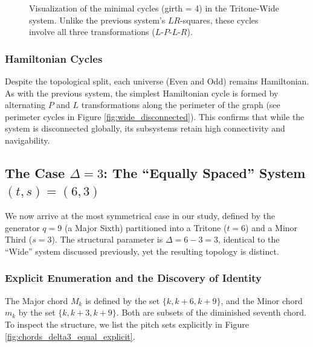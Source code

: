 \documentclass[12pt,letterpaper]{amsart}
\begin{document}
\begin{figure}[H]
    \caption{Visualization of the minimal cycles (girth = 4) in the Tritone-Wide system. Unlike the previous system's $LR$-squares, these cycles involve all three transformations ($L$-$P$-$L$-$R$).}
    \label{fig:wide_minimal}
\end{figure}

\subsubsection{Hamiltonian Cycles}
Despite the topological split, each universe (Even and Odd) remains Hamiltonian. As with the previous system, the simplest Hamiltonian cycle is formed by alternating $P$ and $L$ transformations along the perimeter of the graph (see perimeter cycles in Figure \ref{fig:wide_disconnected}).  
This confirms that while the system is disconnected globally, its subsystems retain high connectivity and navigability.

\subsection{The Case \texorpdfstring{$\Delta=3$}{Delta=3}: The ``Equally Spaced'' System \texorpdfstring{$(t,s)=(6,3)$}{t=6, s=3}}

We now arrive at the most symmetrical case in our study, defined by the generator $q=9$ (a Major Sixth) partitioned into a Tritone ($t=6$) and a Minor Third ($s=3$). The structural parameter is $\Delta = 6 - 3 = 3$, identical to the ``Wide'' system discussed previously, yet the resulting topology is distinct.

\subsubsection{Explicit Enumeration and the Discovery of Identity}
The Major chord $M_k$ is defined by the set $\{k, k+6, k+9\}$, and the Minor chord $m_k$ by the set $\{k, k+3, k+9\}$. Both are subsets of the diminished seventh chord. To inspect the structure, we list the pitch sets explicitly in Figure \ref{fig:chords_delta3_equal_explicit}.
\end{document}
